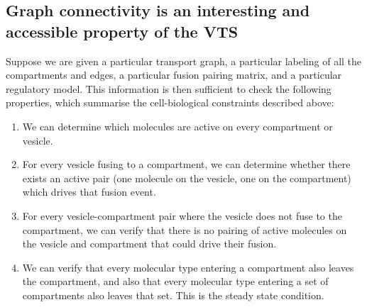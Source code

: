 
%
%
\subsection{Graph connectivity is an interesting and accessible property of the VTS} 
%
Suppose we are given a particular transport graph, a particular labeling of all the compartments and edges, a particular fusion pairing matrix, and a particular regulatory model. This information is then sufficient to check the following properties, which summarise the cell-biological constraints described above:
\begin{enumerate}
	\item We can determine which molecules are active on every compartment or vesicle.
	\item For every vesicle fusing to a compartment, we can determine whether there exists an active pair (one molecule on the vesicle, one on the compartment) which drives that fusion event.
	\item For every vesicle-compartment pair where the vesicle does not fuse to the compartment, we can verify that there is no pairing of active molecules on the
	vesicle and compartment that could drive their fusion.
	\item We can verify that every molecular type entering a compartment also leaves the compartment, and also that every molecular type entering a set of compartments also leaves that set. This is the steady state condition.
\end{enumerate}

